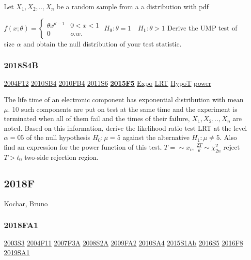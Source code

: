 \documentclass[10pt,twocolumn,portrait]{article}
\begin{document}
Let \(X_1,X_2,..,X_n\) be a random sample from a a distribution with pdf

\(f(x;\theta)=\begin{cases}\theta x^{\theta-1}& 0<x<1\\0& o.w.\end{cases}\)
\(H_0:\theta=1\quad H_1 :\theta>1\) Derive the UMP test of size
\(\alpha\) and obtain the null distribution of your test statistic.

\hypertarget{s4b-2}{%
\subsubsection{2018S4B}\label{s4b-2}}

\protect\hyperlink{f12}{2004F12} \protect\hyperlink{sb4}{2010SB4}
\protect\hyperlink{fb4-1}{2010FB4} \protect\hyperlink{s6-2}{2011S6}
\textbf{\protect\hyperlink{f5-5}{2015F5}} \protect\hyperlink{Expo}{Expo}
\protect\hyperlink{LRT}{LRT} \protect\hyperlink{HypoT}{HypoT}
\protect\hyperlink{power}{power}

The life time of an electronic component has exponential distribution
with mean \(\mu\). 10 such components are put on test at the same time
and the experiment is terminated when all of them fail and the times of
their failure, \(X_1,X_2,..,X_n\) are noted. Based on this information,
derive the likelihood ratio test LRT at the level \(\alpha= 05\) of the
null hypothesis \(H_0:\mu=5\) against the alternative \(H_1:\mu\neq5\).
Also find an expression for the power function of this test.
\(T=\sim x_i\), \(\frac{2T}{\theta}\sim\chi^2_{2n}\) reject \(T>t_0\)
two-side rejection region.

\hypertarget{f-13}{%
\subsection{2018F}\label{f-13}}

Kochar, Bruno

\hypertarget{fa1-4}{%
\subsubsection{2018FA1}\label{fa1-4}}

\protect\hyperlink{s3}{2003S3} \protect\hyperlink{f11}{2004F11}
\protect\hyperlink{f3a}{2007F3A} \protect\hyperlink{s2a}{2008S2A}
\protect\hyperlink{fa2}{2009FA2} \protect\hyperlink{sa4-1}{2010SA4}
\protect\hyperlink{s1ab}{2015S1Ab} \protect\hyperlink{s5-4}{2016S5}
\protect\hyperlink{f8-4}{2016F8} \protect\hyperlink{sa1-3}{2019SA1}
\end{document}
